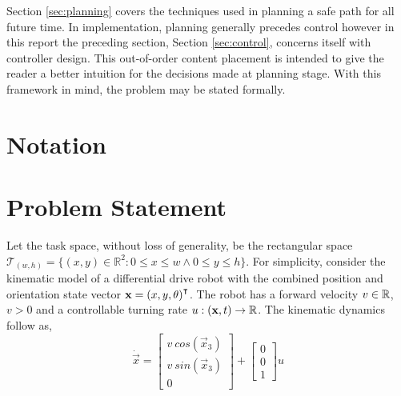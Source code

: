 \documentclass[oneside, 11pt]{book}
\begin{document}
Section \ref{sec:planning} covers the techniques used in planning a safe path for all future time. In implementation, planning generally precedes control however in this report the preceding section, Section \ref{sec:control}, concerns itself with controller design. This out-of-order content placement is intended to give the reader a better intuition for the decisions made at planning stage. With this framework in mind, the problem may be stated formally.

\section{Notation}


\section{Problem Statement}
Let the task space, without loss of generality, be the rectangular space  $\mathcal{T}_{(w,h)} = \{(x,y)\in\mathbb{R}^2 : 0 \leq x \leq w \wedge 0 \leq y \leq h\}$. For simplicity, consider the kinematic model of a differential drive robot with the combined position and orientation state vector $\mathbf{x}={(x,y,\theta)}^{\intercal}$. The robot has a forward velocity $v\in\mathbb{R}$, $v>0$ and a controllable turning rate $u:(\mathbf{x}, t)\to\mathbb{R}$. The kinematic dynamics follow as,
\begin{equation}
    \dot{\vec{x}} =
        \begin{bmatrix}
            v~cos(\vec{x}_3)\\
            v~sin(\vec{x}_3)\\
            0
        \end{bmatrix}
        +
        \begin{bmatrix} 0 \\ 0 \\ 1 \end{bmatrix}
        u
    \label{eqn:basic_kinematic_model}
\end{equation}
\end{document}
